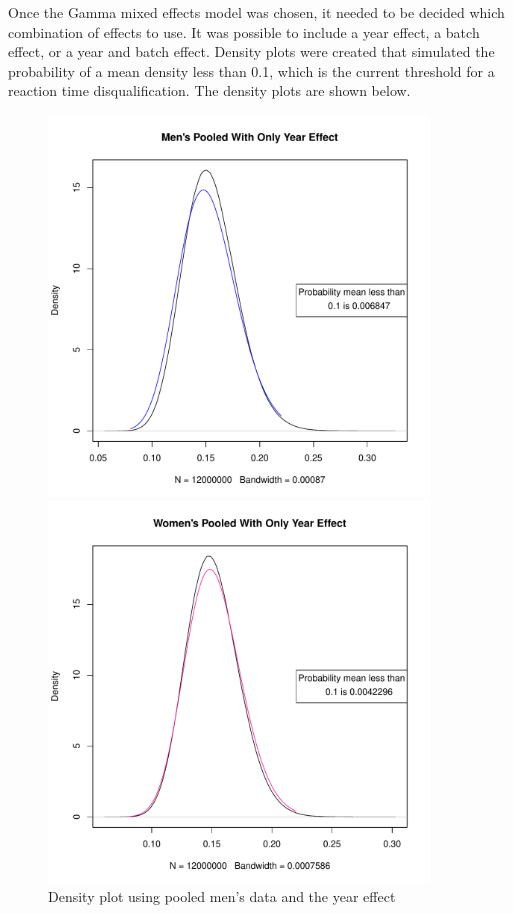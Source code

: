 \documentclass[12pt, letterpaper, titlepage]{article}
\begin{document}
Once the Gamma mixed effects model was chosen, it needed to be decided which combination
of effects to use.  It was possible to include a year effect, a batch effect, or a year
and batch effect.  Density plots were created that simulated the probability of a mean
density less than 0.1, which is the current threshold for a reaction time
disqualification.  The density plots are shown below.

\begin{figure}[h]
  \centering
  \begin{minipage}{0.45\textwidth}
      \centering
      \includegraphics[width=0.9\textwidth]{Men_Density_Year} %
      \caption{Density plot using pooled men's data and the year effect}
  \end{minipage}\hfill
  \begin{minipage}{0.45\textwidth}
      \centering
      \includegraphics[width=0.9\textwidth]{Women_Density_Year} %

\end{minipage}
\end{figure}
\end{document}
